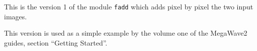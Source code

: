 This is the version 1 of the module \verb+fadd+
which adds pixel by pixel the two input images. 

This version is used as a simple example
by the volume one of the MegaWave2 guides,
section ``Getting Started''.

